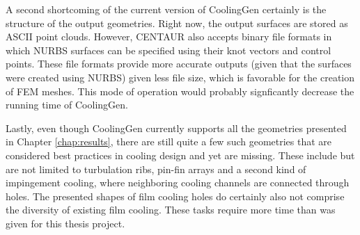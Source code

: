 \documentclass[a4paper, 11pt]{report}
\theoremstyle{definition}
\begin{document}
		A second shortcoming of the current version of CoolingGen certainly is the structure of the output geometries. Right now, the output surfaces are stored as ASCII point clouds. However, CENTAUR also accepts binary file formats in which NURBS surfaces can be specified using their knot vectors and control points. These file formats provide more accurate outputs (given that the surfaces were created using NURBS) given less file size, which is favorable for the creation of FEM meshes. This mode of operation would probably signficantly decrease the running time of CoolingGen.

		Lastly, even though CoolingGen currently supports all the geometries presented in Chapter \ref{chap:results}, there are still quite a few such geometries that are considered best practices in cooling design and yet are missing. These include but are not limited to turbulation ribs, pin-fin arrays and a second kind of impingement cooling, where neighboring cooling channels are connected through holes. The presented shapes of film cooling holes do certainly also not comprise the diversity of existing film cooling. These tasks require more time than was given for this thesis project.

\printbibliography[heading=bibnumbered, title=References]
\end{document}
